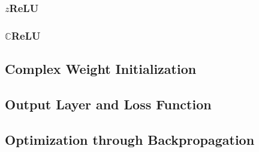  
 \subsubsection{$z$ReLU}
 

 \subsubsection{$\mathbb{C}$ReLU}


 \subsection{Complex Weight Initialization}
 \subsection{Output Layer and Loss Function}
 
 \subsection{Optimization through Backpropagation}









